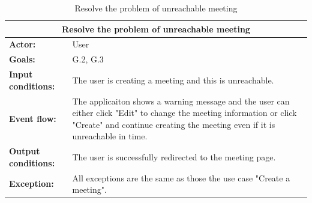 \begin{table}
\begin{tabular} { p{5cm} p{8cm} }  
\multicolumn{2}{c}{\textbf{Resolve the problem of unreachable meeting}}\\
\hline
\textbf{Actor:} & User \\ 
\textbf{Goals:} & G.2, G.3 \\ 
\textbf{Input conditions:} & The user is creating a meeting and this is unreachable.\\
\textbf{Event flow:} & The applicaiton shows a warning message and the user can either click "Edit" to change the meeting information or click "Create" and continue creating the meeting even if it is unreachable in time.\\ 
\textbf{Output conditions:} & The user is successfully redirected to the
meeting page.\\ 
\textbf{Exception:} & All exceptions are the same as those the use case "Create a meeting". \\
\hline
\end{tabular}
\caption{Resolve the problem of unreachable meeting}
\label{ref:resolvetheproblemofunreachablemeeting}
\end{table}
\clearpage

